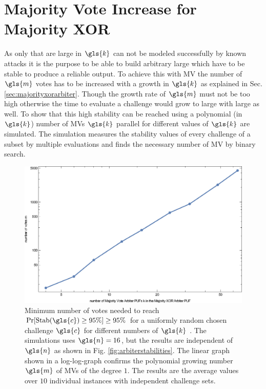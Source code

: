 
\section{Majority Vote Increase for Majority \acs{XOR} \apufs}
\label{sec:majorityvotegrowth}

As only \xpufs that are large in $\gls{k}$ can not be modeled successfully by known attacks it is the purpose to be able to build arbitrary large \xpufs which have to be stable to produce a reliable output.
To achieve this with \ac{MV} the number of $\gls{m}$ votes has to be increased with a growth in $\gls{k}$ as explained in Sec. \ref{sec:majorityxorarbiter}.
Though the growth rate of $\gls{m}$ must not be too high otherwise the time to evaluate a challenge would grow to large with large \xpufs as well. %
To show that this high stability can be reached using a polynomial (in $\gls{k}$) number of \acp{MV} $\gls{k}$ parallel \mpufs for different values of $\gls{k}$ are simulated.
The simulation measures the stability values of every challenge of a subset by multiple evaluations and finds the necessary number of \ac{MV} by binary search.


\begin{figure}[ht]
\includegraphics[width=1.00\textwidth]{images/votes-stab-simulation.eps}
\caption{Minimum number of votes needed to reach $\Pr[\protect\Stab(\gls{c}) \ge 95 \%] \ge 95 \%$ for a uniformly random chosen challenge $\gls{c}$ for different numbers of $\gls{k}$ \apufs. 
The simulations uses $\gls{n} = 16$, but the results are independent of $\gls{n}$ as shown in Fig. \ref{fig:arbiterstabilities}. 
The linear graph shown in a log-log-graph confirms the polynomial growing number $\gls{m}$ of \acp{MV} of the degree $1$.
The results are the average values over $10$ individual \puf instances with independent challenge sets.} 
\label{fig:majorityvotegrowth}
\end{figure}


